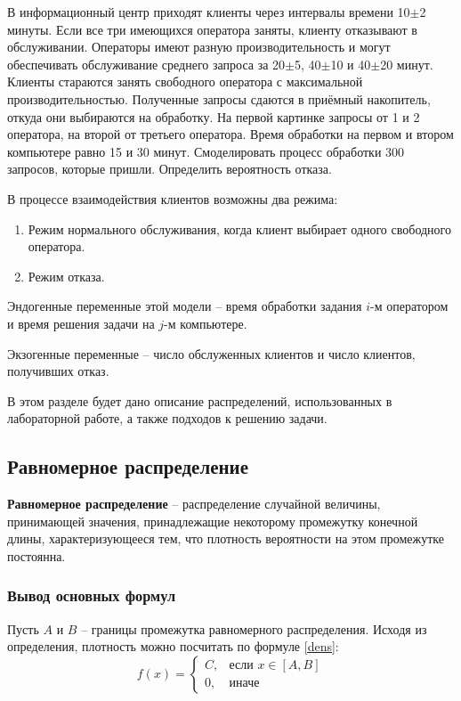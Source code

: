 В информационный центр приходят клиенты через интервалы времени 10$\pm$2 минуты. Если все три имеющихся оператора заняты, клиенту отказывают в обслуживании. Операторы имеют разную производительность и могут обеспечивать обслуживание среднего запроса за 20$\pm$5, 40$\pm$10 и 40$\pm$20 минут. Клиенты стараются занять свободного оператора с максимальной производительностью. Полученные запросы сдаются в приёмный накопитель, откуда они выбираются на обработку. На первой картинке запросы от 1 и 2 оператора, на второй от третьего оператора. Время обработки на первом и втором компьютере равно 15 и 30 минут. Смоделировать процесс обработки 300 запросов, которые пришли. Определить вероятность отказа.

В процессе взаимодействия клиентов возможны два режима:
\begin{enumerate}
	\item Режим нормального обслуживания, когда клиент выбирает одного свободного оператора.
	\item Режим отказа.
\end{enumerate}

Эндогенные переменные этой модели -- время обработки задания $i$-м оператором и время решения задачи на $j$-м компьютере.

Экзогенные переменные -- число обслуженных клиентов и число клиентов, получивших отказ.

\newpage

В этом разделе будет дано описание распределений, использованных в лабораторной работе, а также подходов к решению задачи.

\subsection*{Равномерное распределение}
\textbf{Равномерное распределение} -- распределение случайной величины, принимающей значения, принадлежащие некоторому промежутку конечной длины, характеризующееся тем, что плотность вероятности на этом промежутке постоянна.


\subsubsection*{Вывод основных формул}
Пусть $A$ и $B$ -- границы промежутка равномерного распределения. Исходя из определения, плотность можно посчитать по формуле \ref{dens}:
\begin{equation}
	\label{dens}
	f(x)= 
	\begin{cases}
		C,& \text{если } x \in [A, B]\\
		0,              & \text{иначе}
	\end{cases}
\end{equation}


